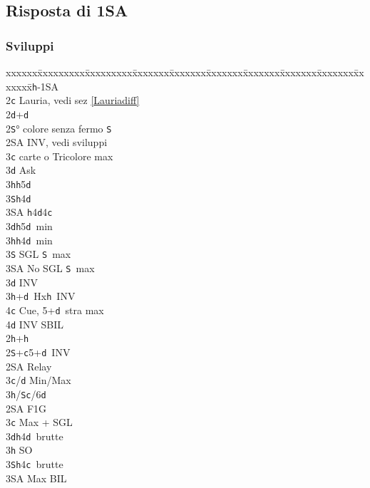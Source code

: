 \documentclass[a4paper,italian]{article}
\newcommand{\BS}{\small{\texttt{S}}}
\newcommand{\BC}{\small{\texttt{c}}}
\newcommand{\BD}{\small{\texttt{d}}}
\newcommand{\BH}{\small{\texttt{h}}}
\newenvironment{bidtable}
{\begin{tabbing}

    xxxxxx\=xxxxxxxxx\=xxxxxxxxx\=xxxxxxx\=xxxxxxx\=xxxxxxx\=xxxxxxx\=xxxxxxx\=xxxxxxx\=xxxxxxx\=\kill}
{\end{tabbing} }%
\begin{document}
\begin{multicols*}{2}
    \subsection{Risposta di 1SA}

    \subsubsection{Sviluppi}

    \begin{bidtable}
        1\BH-1\small{SA}\\
        2\BC\> Lauria, vedi sez \ref{Lauriadiff}\\
        2\BD {}+\BD \+\\
        2\BS {}° colore senza fermo \BS \\
        2\small{SA} \> INV, vedi sviluppi\+\\
        3\BC {} carte o Tricolore max\+\\
        3\BD \> Ask\+\\
        3\BH {}\BH 5\BD \\
        3\BS {}\BH 4\BD \\
        3\small{SA} \BH 4\BD 4\BC \-\-\\
        3\BD {}\BH 5\BD\ min\\
        3\BH {}\BH 4\BD\ min\\
        3\BS \> SGL \BS\ max\\
        3\small{SA} \> No SGL \BS\ max\-\\
        3\BD \> INV\\
        3\BH {}+\BD\ Hx\BH\ INV\\
        4\BC \> Cue, 5+\BD\ stra max \\
        4\BD \> INV SBIL\-\\
        2\BH {}+\BH \+\\
        2\BS {}+\BC 5+\BD\ INV\+\\
        2\small{SA} \> Relay\+\\
        3\BC/\BD \> Min/Max\\
        3\BH/\BS {}\BC /6\BD \-\-\\
        2\small{SA} \> F1G\+\\
        3\BC \> Max + SGL\\
        3\BD {}\BH4\BD\ brutte\\
        3\BH \> SO\\
        3\BS {}\BH4\BC\ brutte\\
        3\small{SA} \> Max BIL\-\\

\end{bidtable}
\end{multicols*}
\end{document}
